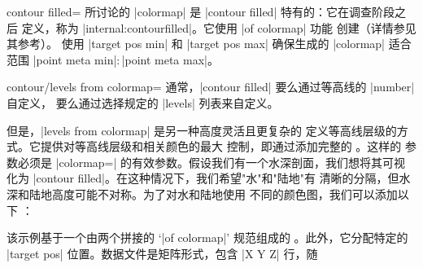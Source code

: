 {{\begin{plottype}[/pgfplots]{
    contour filled=\textcolor{black}{}%
}
    所讨论的 |colormap| 是 |contour filled| 特有的：它在调查阶段之后
    定义，称为 |internal:contourfilled|。它使用 |of colormap| 功能
    创建（详情参见其参考）。\PGFPlots{} 使用 |target pos min| 和
    |target pos max| 确保生成的 |colormap| 适合范围
    |point meta min|$:$|point meta max|。

    \begin{pgfplotskey}{contour/levels from colormap=}
        通常，|contour filled| 要么通过等高线的 |number| 自定义，
        要么通过选择规定的 |levels| 列表来自定义。

        但是，|levels from colormap| 是另一种高度灵活且更复杂的
        定义等高线层级的方式。它提供对等高线层级和相关颜色的最大
        控制，即通过添加完整的 。这样的
        参数必须是 |colormap=|
        的有效参数。假设我们有一个水深剖面，我们想将其可视化为
        |contour filled|。在这种情况下，我们希望"水"和"陆地"有
        清晰的分隔，但水深和陆地高度可能不对称。为了对水和陆地使用
        不同的颜色图，我们可以添加以下
        ：
\pgfplotsexpensiveexample
\begin{codeexample}[]
\end{codeexample}
        该示例基于一个由两个拼接的 `|of colormap|' 规范组成的
        。此外，它分配特定的 |target pos|
        位置。数据文件是矩阵形式，包含 |X Y Z| 行，随 \PGFPlots{}

\end{pgfplotskey}
\end{plottype}}}

